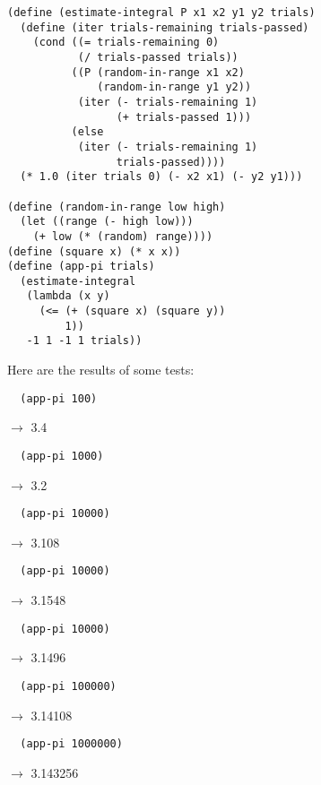 \documentclass[a4paper,12pt]{article}
\begin{document}
\begin{lstlisting}
(define (estimate-integral P x1 x2 y1 y2 trials)
  (define (iter trials-remaining trials-passed)
    (cond ((= trials-remaining 0)
           (/ trials-passed trials))
          ((P (random-in-range x1 x2)
              (random-in-range y1 y2))
           (iter (- trials-remaining 1)
                 (+ trials-passed 1)))
          (else
           (iter (- trials-remaining 1)
                 trials-passed))))
  (* 1.0 (iter trials 0) (- x2 x1) (- y2 y1)))

(define (random-in-range low high)
  (let ((range (- high low)))
    (+ low (* (random) range))))
(define (square x) (* x x))
(define (app-pi trials)
  (estimate-integral
   (lambda (x y)
     (<= (+ (square x) (square y))
         1))
   -1 1 -1 1 trials))
\end{lstlisting}
Here are the results of some tests:
\begin{lstlisting}
  (app-pi 100)
\end{lstlisting}
$\rightarrow$ 3.4
\begin{lstlisting}
  (app-pi 1000)
\end{lstlisting}
$\rightarrow$ 3.2
\begin{lstlisting}
  (app-pi 10000)
\end{lstlisting}
$\rightarrow$ 3.108
\begin{lstlisting}
  (app-pi 10000)
\end{lstlisting}
$\rightarrow$ 3.1548
\begin{lstlisting}
  (app-pi 10000)
\end{lstlisting}
$\rightarrow$ 3.1496
\begin{lstlisting}
  (app-pi 100000)
\end{lstlisting}
$\rightarrow$ 3.14108
\begin{lstlisting}
  (app-pi 1000000)
\end{lstlisting}
$\rightarrow$ 3.143256
\end{document}
